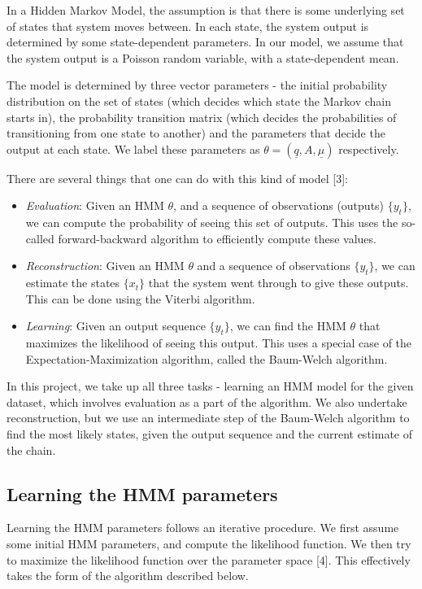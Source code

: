 \documentclass[11pt, twoside]{article}
\begin{document}
In a Hidden Markov Model, the assumption is that there is some underlying set of states that system moves between. In each state, the system output is determined by some state-dependent parameters. In our model, we assume that the system output is a Poisson random variable, with a state-dependent mean.

The model is determined by three vector parameters - the initial probability distribution on the set of states (which decides which state the Markov chain starts in), the probability transition matrix (which decides the probabilities of transitioning from one state to another) and the parameters that decide the output at each state. We label these parameters as $\theta = (\underline{q}, A, \underline{\mu})$ respectively.

There are several things that one can do with this kind of model [3]:
\begin{itemize}
	\item \emph{Evaluation}: Given an HMM $\theta$, and a sequence of observations (outputs) $\{y_t\}$, we can compute the probability of seeing this set of outputs. This uses the so-called forward-backward algorithm to efficiently compute these values.
	\item \emph{Reconstruction}: Given an HMM $\theta$ and a sequence of observations $\{y_t\}$, we can estimate the states $\{x_t\}$ that the system went through to give these outputs. This can be done using the Viterbi algorithm.
	\item \emph{Learning}: Given an output sequence $\{y_t\}$, we can find the HMM $\theta$ that maximizes the likelihood of seeing this output. This uses a special case of the Expectation-Maximization algorithm, called the Baum-Welch algorithm.
\end{itemize}

In this project, we take up all three tasks - learning an HMM model for the given dataset, which involves evaluation as a part of the algorithm. We also undertake reconstruction, but we use an intermediate step of the Baum-Welch algorithm to find the most likely states, given the output sequence and the current estimate of the chain.

\subsection{Learning the HMM parameters}

Learning the HMM parameters follows an iterative procedure. We first assume some initial HMM parameters, and compute the likelihood function. We then try to maximize the likelihood function over the parameter space [4]. This effectively takes the form of the algorithm described below.
\end{document}
